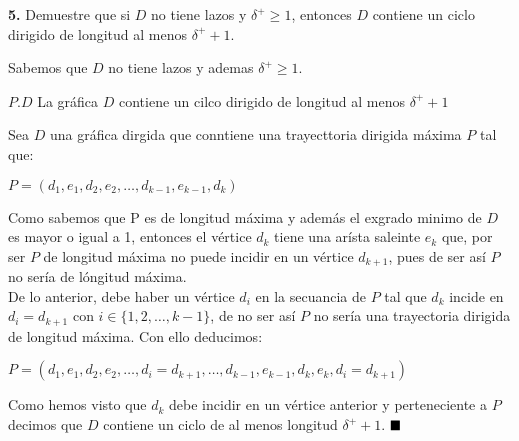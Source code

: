 \documentclass[12pt]{article}
\begin{document}
\vspace{1cm}

%
%
\textbf{5.} Demuestre que si $D$ no tiene lazos y $\delta^+ \geq 1$, entonces $D$ contiene un ciclo dirigido de longitud 
al menos $\delta^+ + 1$.\\

\begin{tcolorbox}[title=\textbf{Hipotesis}, colback=red!15!white, colframe=black!]
    Sabemos que $D$ no tiene lazos y ademas $\delta^{+} \geq 1$.
\end{tcolorbox}
$P.D$ La gráfica $D$ contiene un cilco dirigido de longitud al menos $\delta^{+} + 1$

Sea $D$ una gráfica dirgida que conntiene una trayecttoria dirigida máxima $P$ tal que:
\begin{center}
    $P = (d_1, e_1, d_2, e_2, \dots,d_{k-1}, e_{k - 1}, d_k)$
\end{center}
Como sabemos que P es de longitud máxima y además el exgrado minimo de $D$ es mayor o igual a 1, entonces el vértice $d_k$ tiene 
una arísta saleinte $e_k$ que, por ser $P$ de longitud máxima no puede incidir en un vértice $d_{k +1}$, pues de ser así 
$P$ no sería de lóngitud máxima.\\

De lo anterior, debe haber un vértice $d_i$ en la secuancia de $P$ tal que $d_k$ incide en $d_i = d_{k + 1}$ con $i \in \{1, 2, \dots, k-1\}$,
de no ser así $P$ no sería una trayectoria dirigida de longitud máxima. Con ello deducimos:
\begin{center}
    $P = (d_1, e_1, d_2, e_2,\dots, d_i = d_{k+1}, \dots,d_{k-1}, e_{k - 1}, d_k, e_k, d_i = d_{k+1})$
\end{center}

Como hemos visto que $d_k$ debe incidir en un vértice anterior y perteneciente a $P$ decimos que 
$D$ contiene un ciclo de al menos longitud $\delta^{+} +1$.
$\hfill \blacksquare$ 
\end{document}
